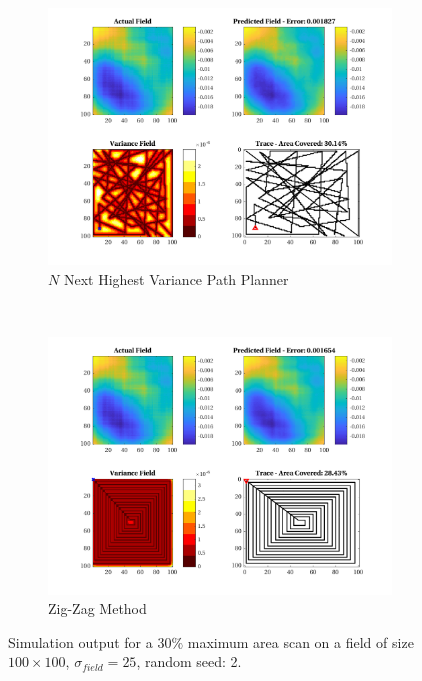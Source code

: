 \begin{figure}[htb!]
\begin{subfigure}[t]{0.5\textwidth}
    \end{subfigure}%
    \\
    \begin{subfigure}[t]{0.5\textwidth}
        \centering
        \includegraphics[width=\linewidth]{figures/hbresults/nnhv_30p_100x100_sf_25_seed_2.png}
        \captionsetup{skip=0.10\baselineskip,size=footnotesize}
        \caption{$N$ Next Highest Variance Path Planner}
    \end{subfigure}%
    ~
    \begin{subfigure}[t]{0.5\textwidth}
        \centering
        \includegraphics[width=\linewidth]{figures/hbresults/zz_30p_100x100_sf_25_seed_2.png}
        \captionsetup{skip=0.10\baselineskip,size=footnotesize}
        \caption{Zig-Zag Method}
    \end{subfigure}%
    \captionsetup{skip=0.20\baselineskip}
    \caption{Simulation output for a $30\%$ maximum area scan on a field of size $100 \times 100$, $\sigma_{field} = 25$, random seed: 2.}
    \label{fig:sim_sigma25_p30_s2}
\end{figure}